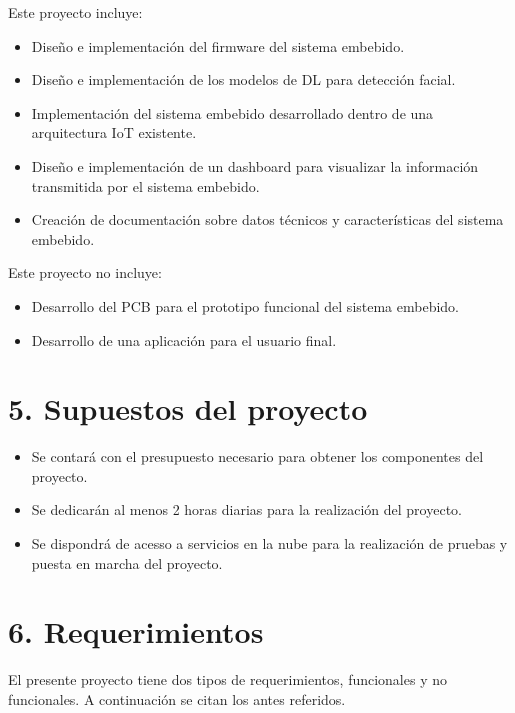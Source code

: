 \documentclass[
11pt, %
]{plan}
\begin{document}
Este proyecto incluye:
\begin{itemize}
	\item Diseño e implementación del firmware del sistema embebido.
	\item Diseño e implementación de los modelos de DL para detección facial.
	\item Implementación del sistema embebido desarrollado dentro de una arquitectura IoT existente.
	\item Diseño e implementación de un dashboard para visualizar la información transmitida por el sistema embebido.
	\item Creación de documentación sobre datos técnicos y características del sistema embebido.
\end{itemize}

Este proyecto no incluye:
\begin{itemize}
	\item Desarrollo del PCB para el prototipo funcional del sistema embebido.
	\item Desarrollo de una aplicación para el usuario final.
\end{itemize}

\section{5. Supuestos del proyecto}
\label{sec:supuestos}

\begin{itemize}
	\item Se contará con el presupuesto necesario para obtener los componentes del proyecto.
	\item Se dedicarán al menos 2 horas diarias para la realización del proyecto.
	\item Se dispondrá de acesso a servicios en la nube para la realización de pruebas y puesta en marcha del proyecto.
\end{itemize}

\section{6. Requerimientos}
\label{sec:requerimientos}

El presente proyecto tiene dos tipos de requerimientos, funcionales y no funcionales. A continuación se citan los antes referidos.
\end{document}

